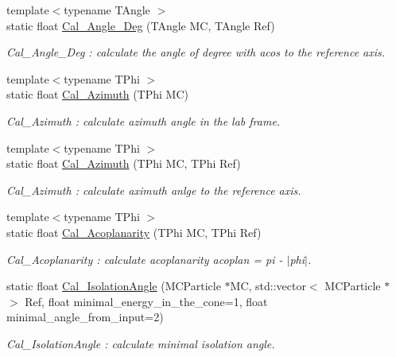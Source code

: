 \begin{DoxyCompactItemize}
{\footnotesize template$<$typename TAngle $>$ }\\static float \hyperlink{classToolSet_1_1CMC_a58389b8e6c06afb39377d6d078e5616f}{Cal\_\-Angle\_\-Deg} (TAngle MC, TAngle Ref)
\begin{DoxyCompactList}\small\item\em Cal\_\-Angle\_\-Deg : calculate the angle of degree with acos to the reference axis. \item\end{DoxyCompactList}\item 
{\footnotesize template$<$typename TPhi $>$ }\\static float \hyperlink{classToolSet_1_1CMC_a3c8cfd47eac44d6e39a38598bb9158f1}{Cal\_\-Azimuth} (TPhi MC)
\begin{DoxyCompactList}\small\item\em Cal\_\-Azimuth : calculate azimuth angle in the lab frame. \item\end{DoxyCompactList}\item 
{\footnotesize template$<$typename TPhi $>$ }\\static float \hyperlink{classToolSet_1_1CMC_ab77fa5dd46a12ac8887776724261f72b}{Cal\_\-Azimuth} (TPhi MC, TPhi Ref)
\begin{DoxyCompactList}\small\item\em Cal\_\-Azimuth : calculate aximuth anlge to the reference axis. \item\end{DoxyCompactList}\item 
{\footnotesize template$<$typename TPhi $>$ }\\static float \hyperlink{classToolSet_1_1CMC_aa1667ca515e4b26ca43755fd8d2e30bd}{Cal\_\-Acoplanarity} (TPhi MC, TPhi Ref)
\begin{DoxyCompactList}\small\item\em Cal\_\-Acoplanarity : calculate acoplanarity acoplan = pi -\/ $|$phi$|$. \item\end{DoxyCompactList}\item 
static float \hyperlink{classToolSet_1_1CMC_a3d0ff5af967b32efbc5907174b64348f}{Cal\_\-IsolationAngle} (MCParticle $\ast$MC, std::vector$<$ MCParticle $\ast$ $>$ Ref, float minimal\_\-energy\_\-in\_\-the\_\-cone=1, float minimal\_\-angle\_\-from\_\-input=2)
\begin{DoxyCompactList}\small\item\em Cal\_\-IsolationAngle : calculate minimal isolation angle. \item\end{DoxyCompactList}\item 

\end{DoxyCompactItemize}
